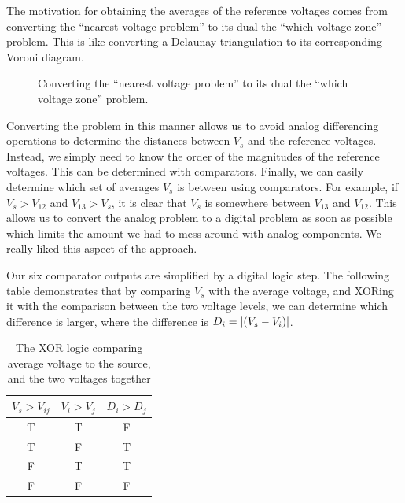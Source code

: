 \documentclass{article}
\begin{document}
The motivation for obtaining the averages of the reference voltages comes from converting the ``nearest voltage problem'' to its dual the ``which voltage zone'' problem. This is like converting a Delaunay triangulation to its corresponding Voroni diagram.
\begin{figure}[H]
	\centering
	\caption{Converting the ``nearest voltage problem'' to its dual the ``which voltage zone'' problem.}
\end{figure}
Converting the problem in this manner allows us to avoid analog differencing operations to determine the distances between $V_s$ and the reference voltages. Instead, we simply need to know the order of the magnitudes of the reference voltages. This can be determined with comparators. Finally, we can easily determine which set of averages $V_s$ is between using comparators. For example, if $V_s > V_{12}$ and $V_{13} > V_s$, it is clear that $V_s$ is somewhere between $V_{13}$ and $V_{12}$. This allows us to convert the analog problem to a digital problem as soon as possible which limits the amount we had to mess around with analog components. We really liked this aspect of the approach.

Our six comparator outputs are simplified by a digital logic step. The following table demonstrates that by comparing $V_s$ with the average voltage, and XORing it with the comparison between the two voltage levels, we can determine which difference is larger, where the difference is $D_i = \abs{\left(V_s - V_i \right)}$.
\begin{table}[H]
	\centering
	\caption{The XOR logic comparing average voltage to the source, and the two voltages together}
	\begin{tabular}{cc|c}
		$V_s > V_{ij}$ & $V_i > V_j$ & $D_i > D_j$ \\\hline
		T & T & F \\
		T & F & T \\
		F & T & T \\
		F & F & F \\
	\end{tabular}
\end{table}
\end{document}
